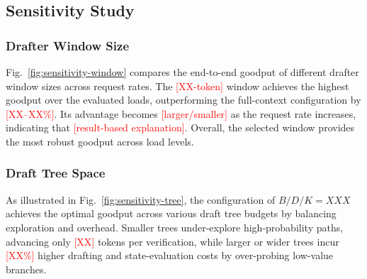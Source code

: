 \documentclass[sigconf,nonacm,10pt]{acmart}
\begin{document}
{{\subsection{Sensitivity Study}
\subsubsection{Drafter Window Size}
Fig.~\ref{fig:sensitivity-window} compares the end-to-end goodput of
different drafter window sizes across request rates. The
\textcolor{red}{[XX-token]} window achieves the highest goodput over
the evaluated loads, outperforming the full-context
configuration by \textcolor{red}{[XX--XX\%]}. Its advantage becomes
\textcolor{red}{[larger/smaller]} as the request rate increases, indicating
that \textcolor{red}{[result-based explanation]}. Overall, the selected window
provides the most robust goodput across load levels.

\subsubsection{Draft Tree Space}
As illustrated in Fig.~\ref{fig:sensitivity-tree}, the configuration of $B/D/K=XXX$ achieves the optimal goodput across various draft tree budgets by balancing exploration and overhead. Smaller trees under-explore high-probability paths, advancing only \textcolor{red}{[XX]} tokens per verification, while larger or wider trees incur \textcolor{red}{[XX\%]} higher drafting and state-evaluation costs by over-probing low-value branches.

}}
\end{document}
